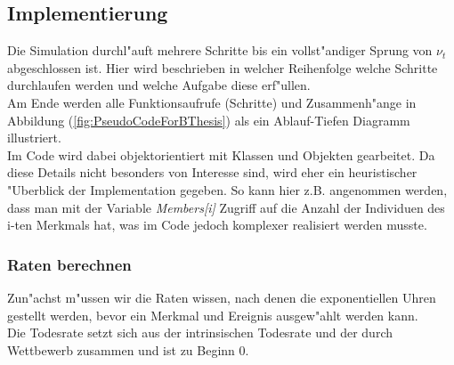 \documentclass[11pt, a4paper, german]{article}
\theoremstyle{plain}
\begin{document}
	\subsection{Implementierung}
	Die Simulation durchl"auft mehrere Schritte bis ein vollst"andiger Sprung von $ \nu_t $ abgeschlossen ist. Hier wird beschrieben in welcher Reihenfolge welche Schritte durchlaufen werden und welche Aufgabe diese erf"ullen.\\
	Am Ende werden alle Funktionsaufrufe (Schritte) und Zusammenh"ange in Abbildung (\ref{fig:PseudoCodeForBThesis}) als ein Ablauf-Tiefen Diagramm illustriert.\\
	Im Code wird dabei objektorientiert mit Klassen und Objekten gearbeitet. Da diese Details nicht besonders von Interesse sind, wird eher ein heuristischer "Uberblick der Implementation gegeben. So kann hier z.B. angenommen werden, dass man mit der Variable \textit{Members[i]} Zugriff auf die Anzahl der Individuen des i-ten Merkmals hat, was im Code jedoch komplexer realisiert werden musste.\\
	
	\subsubsection{Raten berechnen}	
	Zun"achst m"ussen wir die Raten wissen, nach denen die exponentiellen Uhren gestellt werden, bevor ein Merkmal und Ereignis ausgew"ahlt werden kann.\\
	Die Todesrate setzt sich aus der intrinsischen Todesrate und der durch Wettbewerb zusammen und ist zu Beginn 0.\\
	
\end{document}
